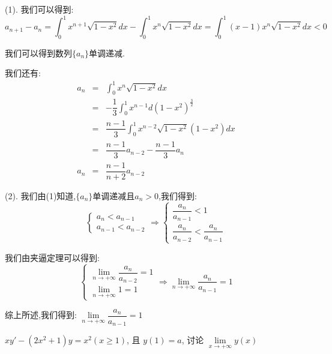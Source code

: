 \begin{anymark}[注]
	(1). 我们可以得到: 
	$$a_{n+1}-a_{n}=\int_{0}^{1}x^{n+1}\sqrt{1-x^2}dx-\int_{0}^{1}x^{n}\sqrt{1-x^2}dx=\int_{0}^{1}(x-1)x^{n}\sqrt{1-x^2}dx<0$$
	
	我们可以得到数列$\{a_{n}\}$单调递减.
	
	我们还有: 
	\begin{eqnarray*}
		a_{n}&=&\int_{0}^{1}x^{n}\sqrt{1-x^2}dx\\
		&=&-\dfrac{1}{3}\int_{0}^{1}x^{n-1}d(1-x^2)^{\frac{3}{2}}\\
		&=&\dfrac{n-1}{3}\int_{0}^{1}x^{n-2}\sqrt{1-x^2}(1-x^2)dx\\
		&=&\dfrac{n-1}{3}a_{n-2}-\dfrac{n-1}{3}a_{n}\\
		a_{n}&=&\dfrac{n-1}{n+2}a_{n-2}
	\end{eqnarray*}
	
	(2). 我们由(1)知道,$\{a_{n}\}$单调递减且$a_{n}>0$,我们得到: 
	$$\left\lbrace
	\begin{array}{l}
		a_{n}<a_{n-1}\\a_{n-1}<a_{n-2}
	\end{array}
	\right. \Rightarrow \left\lbrace
	\begin{array}{l}
		\dfrac{a_{n}}{a_{n-1}}<1\\\dfrac{a_{n}}{a_{n-2}}<\dfrac{a_{n}}{a_{n-1}}
	\end{array}
	\right. $$
	
	我们由夹逼定理可以得到: 
	$$\left\lbrace
	\begin{array}{l}
		\lim\limits_{n\to +\infty}\dfrac{a_{n}}{a_{n-2}}=1\\
		\lim\limits_{n\to +\infty}1=1
	\end{array}
	\right. \Rightarrow \lim\limits_{n\to +\infty}\dfrac{a_{n}}{a_{n-1}}=1$$
	
	综上所述,我们得到: $\lim\limits_{n\to +\infty}\dfrac{a_{n}}{a_{n-1}}=1$
\end{anymark}

\begin{example}[][Exam: 31.4.2]
	$xy'-(2x^2+1)y=x^2(x\geq 1)$, 且 $y(1)=a$, 讨论 $\lim\limits_{x\to +\infty}y(x)$
\end{example}

